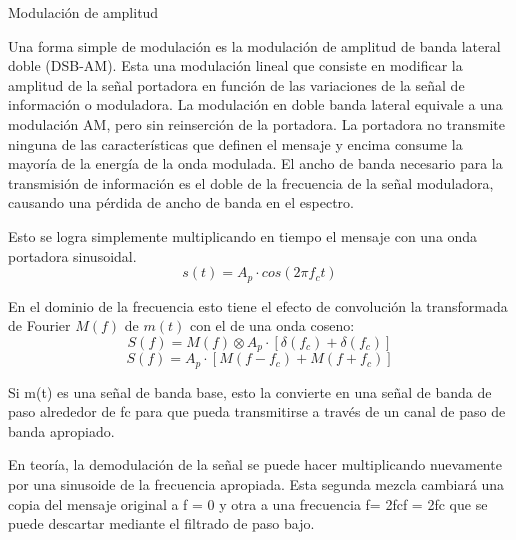 Modulación de amplitud
   


Una forma simple de modulación es la modulación de amplitud de banda lateral doble (DSB-AM). 
Esta una modulación lineal que consiste en modificar la amplitud de la señal portadora en función de las variaciones de la señal de información o moduladora. La modulación en doble banda lateral equivale a una modulación AM, pero sin reinserción de la portadora.
La portadora no transmite ninguna de las características que definen el mensaje y encima consume la mayoría de la energía de la onda modulada. El ancho de banda necesario para la transmisión de información es el doble de la frecuencia de la señal moduladora, causando una pérdida de ancho de banda en el espectro. 


Esto se logra simplemente multiplicando en tiempo el mensaje con una onda portadora sinusoidal.
$$ s(t) =A_p \cdot cos(2 \pi f_c t)  $$

En el dominio de la frecuencia esto tiene el efecto de convolución la transformada de Fourier $M(f)$ de $m(t)$ con el de una onda coseno:
$$ S(f) = M(f) \otimes A_p \cdot [\delta(f_c) +\delta(f_c)] $$ 
$$ S(f) = A_p \cdot [M(f − f_c) + M (f + f_c)] $$


Si m(t) es una señal de banda base, esto la convierte en una señal de banda de paso alrededor de fc para que pueda transmitirse a través de un canal de paso de banda apropiado.
  

En teoría, la demodulación de la señal se puede hacer multiplicando nuevamente por una sinusoide de la frecuencia apropiada. Esta segunda mezcla cambiará una copia del mensaje original a f = 0 y otra a una frecuencia f= 2fcf = 2fc que se puede descartar mediante el filtrado de paso bajo. 
  

